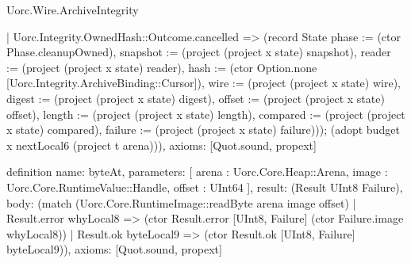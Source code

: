 \begin{lexlean}{Uorc.Wire.ArchiveIntegrity}
\begin{semanticmodule}
{    | Uorc.Integrity.OwnedHash::Outcome.cancelled => (record State {phase := (ctor Phase.cleanupOwned), snapshot := (project (project x state) snapshot), reader := (project (project x state) reader), hash := (ctor Option.none [Uorc.Integrity.ArchiveBinding::Cursor]), wire := (project (project x state) wire), digest := (project (project x state) digest), offset := (project (project x state) offset), length := (project (project x state) length), compared := (project (project x state) compared), failure := (project (project x state) failure)})); (adopt budget x nextLocal6 (project t arena))),
  axioms: [Quot.sound, propext]
}

definition{
  name: byteAt,
  parameters: [
    arena : Uorc.Core.Heap::Arena,
    image : Uorc.Core.RuntimeValue::Handle,
    offset : UInt64
  ],
  result: (Result UInt8 Failure),
  body: (match (Uorc.Core.RuntimeImage::readByte arena image offset)
    | Result.error whyLocal8 => (ctor Result.error [UInt8, Failure] (ctor Failure.image whyLocal8))
    | Result.ok byteLocal9 => (ctor Result.ok [UInt8, Failure] byteLocal9)),
  axioms: [Quot.sound, propext]
}


\end{semanticmodule}
\end{lexlean}
